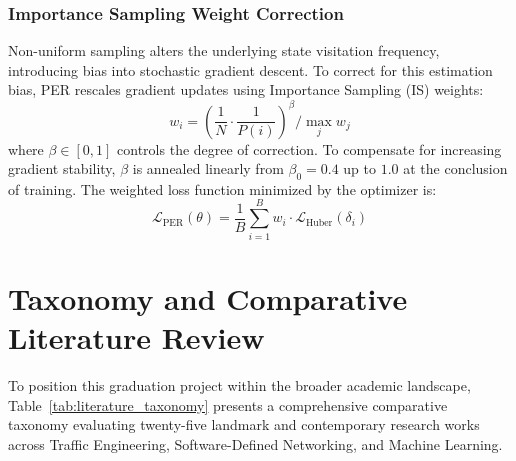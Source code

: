 \subsubsection{Importance Sampling Weight Correction}
Non-uniform sampling alters the underlying state visitation frequency, introducing bias into stochastic gradient descent. To correct for this estimation bias, PER rescales gradient updates using Importance Sampling (IS) weights:
\begin{equation}
    w_i = \left( \frac{1}{N} \cdot \frac{1}{P(i)} \right)^\beta \Big/ \max_{j} w_j
    \label{eq:per_is_weights}
\end{equation}
where $\beta \in [0, 1]$ controls the degree of correction. To compensate for increasing gradient stability, $\beta$ is annealed linearly from $\beta_0 = 0.4$ up to $1.0$ at the conclusion of training. The weighted loss function minimized by the optimizer is:
\begin{equation}
    \mathcal{L}_{\text{PER}}(\theta) = \frac{1}{B} \sum_{i=1}^B w_i \cdot \mathcal{L}_{\text{Huber}}(\delta_i)
\end{equation}

\section{Taxonomy and Comparative Literature Review}
To position this graduation project within the broader academic landscape, Table~\ref{tab:literature_taxonomy} presents a comprehensive comparative taxonomy evaluating twenty-five landmark and contemporary research works across Traffic Engineering, Software-Defined Networking, and Machine Learning.

